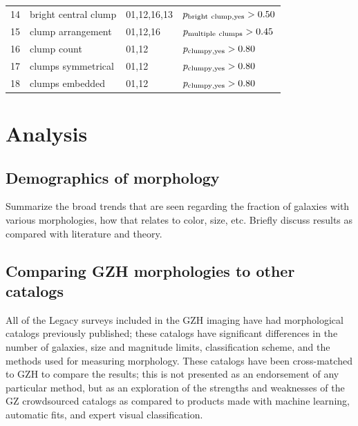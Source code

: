 \documentclass[twocolumn]{aastex6}
\begin{document}
\begin{table}
\begin{tabular}{llll}
14       & bright central clump & 01,12,16,13      & $p_{\rm bright~clump,yes}>0.50$    \\
15       & clump arrangement    & 01,12,16         & $p_{\rm multiple~clumps}>0.45$     \\
16       & clump count          & 01,12            & $p_{\rm clumpy,yes}>0.80$          \\
17       & clumps symmetrical   & 01,12            & $p_{\rm clumpy,yes}>0.80$          \\
18       & clumps embedded      & 01,12            & $p_{\rm clumpy,yes}>0.80$          \\
\hline\hline
\end{tabular}
\end{table}

\section{Analysis}\label{sec:analysis}


\subsection{Demographics of morphology}

{\note Summarize the broad trends that are seen regarding the fraction of galaxies with various morphologies, how that relates to color, size, etc. Briefly discuss results as compared with literature and theory.}

\subsection{Comparing GZH morphologies to other catalogs}\label{ssec:comparisons}

All of the Legacy surveys included in the GZH imaging have had morphological catalogs previously published; these catalogs have significant differences in the number of galaxies, size and magnitude limits, classification scheme, and the methods used for measuring morphology. These catalogs have been cross-matched to GZH to compare the results; this is not presented as an endorsement of any particular method, but as an exploration of the strengths and weaknesses of the GZ crowdsourced catalogs as compared to products made with machine learning, automatic fits, and expert visual classification. 
\end{document}

